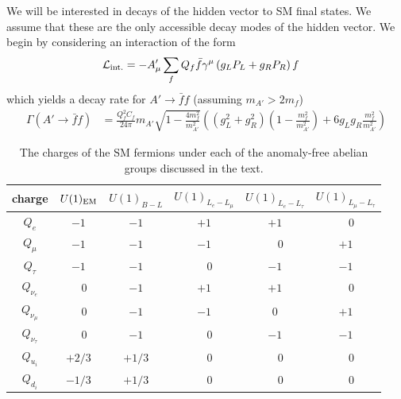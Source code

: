 We will be interested in decays of the hidden vector to SM final states. We assume that these are the only accessible decay modes of the hidden vector. We begin by considering an interaction of the form
\begin{align}
    {\cal L}_{\rm int.} &= -A'_\mu\sum_f Q_f\bar{f}\gamma^\mu\left(g_L P_L + g_R P_R\right)f
\end{align}
which yields a decay rate for $A'\rightarrow \bar{f}f$ (assuming $m_{A'} > 2m_f$)
\begin{align}
    \Gamma(A' \rightarrow \bar{f}f) &= \frac{Q_f^2C_f}{24\pi}m_{A'}\sqrt{1-\frac{4m_f^2}{m_{A'}^2}}\left((g_L^2 + g_R^2)\left(1-\frac{m_f^2}{m_{A'}^2}\right)+6g_Lg_R\frac{m_f^2}{m_{A'}^2}\right)
\end{align}
\begin{table}[]
\centering
\begin{tabular}{@{}cccccc@{}}
\toprule
{\rm charge}        & $U(1)_{\rm EM}$ & $U(1)_{B-L}$ & $U(1)_{L_e - L_\mu}$ & $U(1)_{L_e - L_\tau}$ & $U(1)_{L_\mu - L_\tau}$ \\ \midrule
$Q_e$        & $-1$            & $-1$         & $+1$                 & $+1$                  &\ \ $0$                     \\
$Q_\mu$      & $-1$            & $-1$         & $-1$                 &\ \ $0$                   & $+1$                    \\
$Q_\tau$     & $-1$            & $-1$         &\ \ $0$                  & $-1$                  & $-1$                    \\
$Q_{\nu_e}$    &\ \ $0$             & $-1$         & $+1$                 & $+1$                  &\ \ $0$                     \\
$Q_{\nu_\mu}$  &\ \ $0$             & $-1$         & $-1$                 & $0$                   & $+1$                    \\
$Q_{\nu_\tau}$ &\ \ $0$             & $-1$         &\ \ $0$                  & $-1$                  & $-1$                    \\
$Q_{u_i}$      & $+2/3$          & $+1/3$        &\ \ $0$                  &\ \ $0$                   &\ \ $0$                     \\
$Q_{d_i}$      & $-1/3$          & $+1/3$        &\ \ $0$                  &\ \ $0$                   &\ \ $0$                     \\ \bottomrule
\end{tabular}
\caption{The charges of the SM fermions under each of the anomaly-free abelian groups discussed in the text.}
\label{table:U1_charges}
\end{table}
